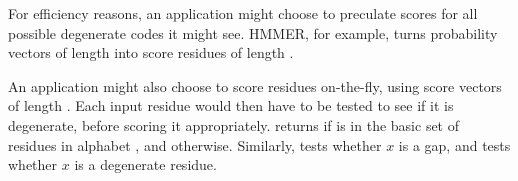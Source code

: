 For efficiency reasons, an application might choose to preculate
scores for all possible degenerate codes it might see. HMMER, for
example, turns probability vectors of length  into score
residues of length .

An application might also choose to score residues on-the-fly, using
score vectors of length . Each input residue  would
then have to be tested to see if it is degenerate, before scoring it
appropriately.   returns 
if  is in the basic set of  residues in alphabet
, and  otherwise. Similarly,
 tests whether $x$ is a gap, and
 tests whether $x$ is a degenerate
residue.

